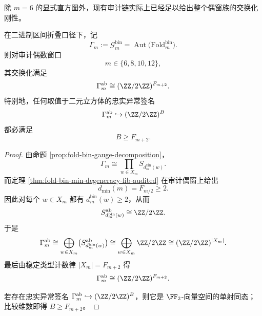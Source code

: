 除 \(m=6\) 的显式直方图外，现有审计链实际上已经足以给出整个偶窗族的交换化刚性。

\begin{theorem}\label{thm:derived-foldbin-gauge-abelianization-even-windows}
在二进制区间折叠口径下，记
\[
\Gamma_m:=\mathcal G_m^{\mathrm{bin}}
=
\operatorname{Aut}\!\bigl(\mathrm{Fold}^{\mathrm{bin}}_m\bigr).
\]
则对审计偶数窗口
\[
m\in\{6,8,10,12\},
\]
其交换化满足
\[
\Gamma_m^{\mathrm{ab}}
\cong
(\ZZ/2\ZZ)^{F_{m+2}}.
\]
特别地，任何取值于二元立方体的忠实异常签名
\[
\Gamma_m^{\mathrm{ab}}\hookrightarrow (\ZZ/2\ZZ)^B
\]
都必满足
\[
B\ge F_{m+2}.
\]
\end{theorem}

\begin{proof}
由命题 \ref{prop:fold-bin-gauge-decomposition}，
\[
\Gamma_m\cong \prod_{w\in X_m} S_{d_m^{\mathrm{bin}}(w)}.
\]
而定理 \ref{thm:fold-bin-min-degeneracy-fib-audited} 在审计偶窗上给出
\[
d_{\min}(m)=F_{m/2}\ge 2.
\]
因此对每个 \(w\in X_m\) 都有 \(d_m^{\mathrm{bin}}(w)\ge 2\)，从而
\[
S_{d_m^{\mathrm{bin}}(w)}^{\mathrm{ab}}\cong \ZZ/2\ZZ.
\]
于是
\[
\Gamma_m^{\mathrm{ab}}
\cong
\bigoplus_{w\in X_m}\bigl(S_{d_m^{\mathrm{bin}}(w)}^{\mathrm{ab}}\bigr)
\cong
\bigoplus_{w\in X_m}\ZZ/2\ZZ
\cong
(\ZZ/2\ZZ)^{|X_m|}.
\]
最后由稳定类型计数律 \(|X_m|=F_{m+2}\) 得
\[
\Gamma_m^{\mathrm{ab}}\cong (\ZZ/2\ZZ)^{F_{m+2}}.
\]

若存在忠实异常签名 \(\Gamma_m^{\mathrm{ab}}\hookrightarrow (\ZZ/2\ZZ)^B\)，则它是 \(\FF_2\)-向量空间的单射同态；比较维数即得 \(B\ge F_{m+2}\)。
\end{proof}
